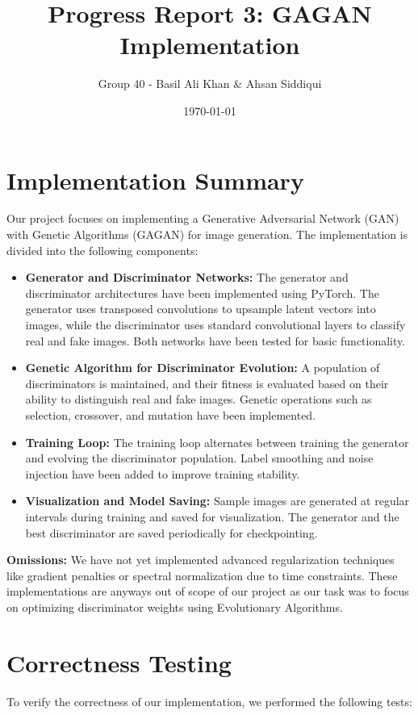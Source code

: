 \documentclass[12pt]{article}
\title{Progress Report 3: GAGAN Implementation}
\author{Group 40 - Basil Ali Khan \& Ahsan Siddiqui}
\date{\today}
\begin{document}
\maketitle

\section*{Implementation Summary}
Our project focuses on implementing a Generative Adversarial Network (GAN) with Genetic Algorithms (GAGAN) for image generation. The implementation is divided into the following components:

\begin{itemize}
    \item \textbf{Generator and Discriminator Networks:}  
    The generator and discriminator architectures have been implemented using PyTorch. The generator uses transposed convolutions to upsample latent vectors into images, while the discriminator uses standard convolutional layers to classify real and fake images. Both networks have been tested for basic functionality.

    \item \textbf{Genetic Algorithm for Discriminator Evolution:}  
    A population of discriminators is maintained, and their fitness is evaluated based on their ability to distinguish real and fake images. Genetic operations such as selection, crossover, and mutation have been implemented.

    \item \textbf{Training Loop:}  
    The training loop alternates between training the generator and evolving the discriminator population. Label smoothing and noise injection have been added to improve training stability.

    \item \textbf{Visualization and Model Saving:}  
    Sample images are generated at regular intervals during training and saved for visualization. The generator and the best discriminator are saved periodically for checkpointing.
\end{itemize}

\textbf{Omissions:}  
We have not yet implemented advanced regularization techniques like gradient penalties or spectral normalization due to time constraints. These implementations are anyways out of scope of our project as our task was to focus on optimizing discriminator weights using Evolutionary Algorithms.

\section*{Correctness Testing}
To verify the correctness of our implementation, we performed the following tests:
\end{document}
